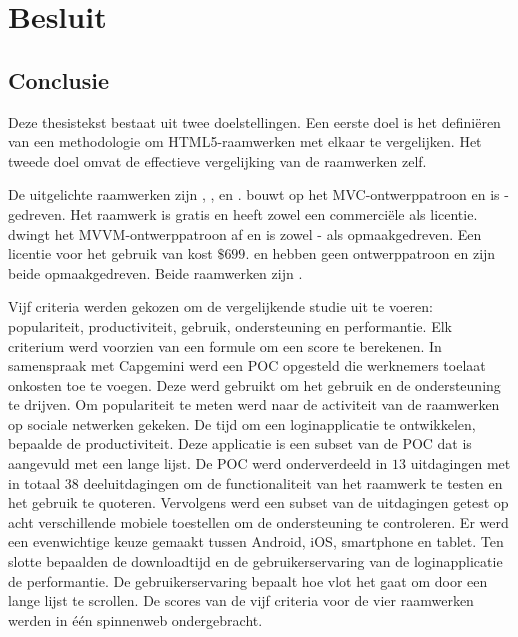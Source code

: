 \chapter{Besluit}
\label{chap:besluit}

\section{Conclusie} %

Deze thesistekst bestaat uit twee doelstellingen.
Een eerste doel is het definiëren van een methodologie om HTML5-raamwerken met elkaar te vergelijken.
Het tweede doel omvat de effectieve vergelijking van de raamwerken zelf.

De uitgelichte raamwerken zijn \st{}, \kendo{},  \jqm{} en \lungo{}.
\st{} bouwt op het MVC-ontwerppatroon en is \js-gedreven.
Het raamwerk is gratis en heeft zowel een commerciële als  licentie.
\kendo{} dwingt het MVVM-ontwerppatroon af en is zowel \js- als opmaakgedreven.
Een licentie voor het gebruik van \kendo{} kost $\$699$.
\jqm{} en \lungo{} hebben geen ontwerppatroon en zijn beide opmaakgedreven.
Beide raamwerken zijn .

Vijf criteria werden gekozen om de vergelijkende studie uit te voeren:  populariteit,  productiviteit,  gebruik,  ondersteuning en performantie.
Elk criterium werd voorzien van een formule om een score te berekenen.
In samenspraak met Capgemini werd een POC opgesteld die werknemers toelaat onkosten toe te voegen.
Deze werd gebruikt om het gebruik en de ondersteuning te drijven.  
Om populariteit te meten werd naar de activiteit van de raamwerken op sociale netwerken gekeken.
De tijd om een loginapplicatie te ontwikkelen, bepaalde de productiviteit.
Deze applicatie is een subset van de POC dat is aangevuld met een lange lijst.
De POC werd onderverdeeld in $13$ uitdagingen met in totaal $38$ deeluitdagingen om de functionaliteit van het raamwerk te testen en het gebruik te quoteren.
Vervolgens werd een subset van de uitdagingen getest op acht verschillende mobiele toestellen om de ondersteuning te controleren.
Er werd een evenwichtige keuze gemaakt tussen Android, iOS, smartphone en tablet.
Ten slotte bepaalden de downloadtijd en de gebruikerservaring van de loginapplicatie de performantie.
De gebruikerservaring bepaalt hoe vlot het gaat om door een lange lijst te scrollen.
De scores van de vijf criteria voor de vier raamwerken werden in één spinnenweb ondergebracht.

